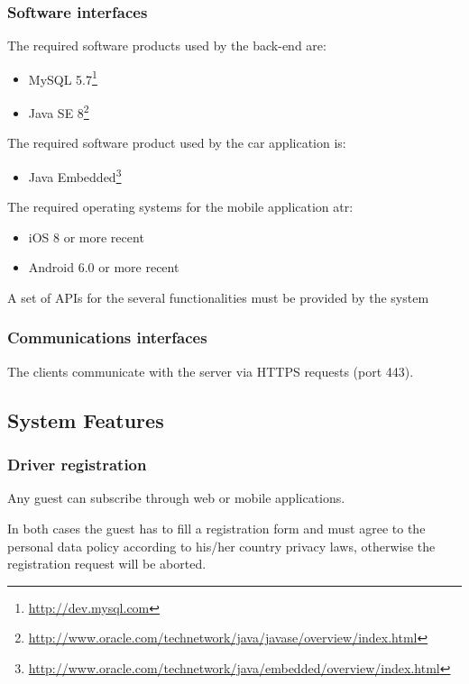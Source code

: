 \begin{itemize}
\subsubsection{Software interfaces}
The required software products used by the back-end are:
\begin{itemize}
	\item MySQL 5.7\footnote{\url{http://dev.mysql.com}}
	\item Java SE 8\footnote{\url{http://www.oracle.com/technetwork/java/javase/overview/index.html}}
\end{itemize}
The required software product used by the car application is:
\begin{itemize}
	\item Java Embedded\footnote{\url{http://www.oracle.com/technetwork/java/embedded/overview/index.html}}
\end{itemize}
The required operating systems for the mobile application atr:
\begin{itemize}
	\item iOS 8 or more recent
	\item Android 6.0 or more recent
\end{itemize}

A set of APIs for the several functionalities must be provided by the system
	
\subsubsection{Communications interfaces}
The clients communicate with the server via HTTPS requests (port 443).

\end{itemize}

\subsection{System Features}

\subsubsection{Driver registration}

Any guest can subscribe through web or mobile applications.

In both cases the guest has to fill a registration form and must agree to the personal data policy according to his/her country privacy laws, otherwise the registration request will be aborted.

